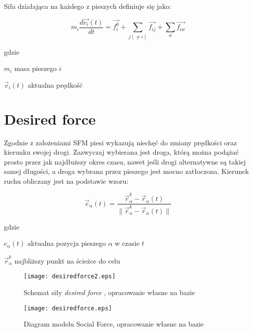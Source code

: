 Siła działająca na każdego z pieszych definiuje się jako:

\begin{equation}
m_{i} \frac{d\vec{v_{i}}(t)}{dt} = \vec{f_{i}^{0}} + \sum_{j(\neq i)} \vec{f_{ij}} + \sum _{w} \vec{f_{iw}}
\end{equation}

gdzie
\begin{eqwhere}[2cm]
	\item[$m_{i}$] masa pieszego $i$
	\item[$\vec{v}_{i}(t)$] aktualna prędkość
\end{eqwhere}

\section{Desired force}
\label{sec:desiredForce}

Zgodnie z założeniami SFM piesi wykazują niechęć do zmiany prędkości oraz kierunku swojej drogi. Zazwyczaj wybierana jest droga, którą można podążać prosto przez jak najdłuższy okres czasu, nawet jeśli drogi alternatywne są takiej samej długości, a droga wybrana przez pieszego jest mocno zatłoczona. Kierunek ruchu obliczany jest na podstawie wzoru:

\begin{equation}
\vec{e}_{\alpha}(t) = \frac{\vec{r}_{\alpha}^{k} - \vec{r}_{\alpha}(t)}{\parallel \vec{r}_{\alpha}^{k} - \vec{r}_{\alpha}(t) \parallel}
\end{equation}

gdzie
\begin{eqwhere}[2cm]
	\item[$e_{\alpha}(t)$] aktualna pozycja pieszego $\alpha$ w czasie $t$
	\item[$\vec{r}_{\alpha}^{k}$] najbliższy punkt na ścieżce do celu
\end{eqwhere}

\begin{figure}
\centering
\texttt{[image: desiredforce2.eps]}
\caption{Schemat siły \textit{desired force} , opracowanie własne na bazie \cite{AMSFMfPBSaSC}}
\end{figure}

\begin{figure}
\centering
\texttt{[image: desiredforce.eps]}
\caption{Diagram modelu Social Force, opracowanie własne na bazie \cite{GuideCrowdDynViaModifiedSocialForceModel}}
\end{figure}

